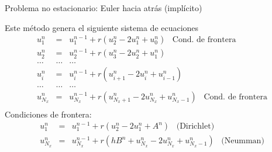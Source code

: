 \documentclass{beamer}
\begin{document}
\begin{frame}{Problema no estacionario: Euler hacia atr\'as (impl\'icito)}

Este método genera el siguiente sistema de ecuaciones
\begin{eqnarray*}
u_{1}^{n} & = & u_{1}^{n-1} + r \left(u_{2}^{n} - 2 u_{1}^{n} + \boxed{u_{0}^{n}}\right) \,\,\, \mbox{ Cond. de frontera}\\
u_{2}^{n} & = & u_{2}^{n-1} + r \left(u_{3}^{n} - 2 u_{2}^{n} + u_{1}^{n}\right) \\
\dots & \dots & \dots \\
u_{i}^{n} & = & u_{i}^{n-1} + r \left(u_{i+1}^{n} - 2 u_{i}^{n} + u_{i-1}^{n}\right) \\
\dots & \dots & \dots \\
u_{N_x}^{n} & = & u_{N_x}^{n-1} + r \left(\boxed{u_{N_x+1}^{n}} - 2 u_{N_x}^{n} + u_{N_x-1}^{n}\right) \,\,\, \mbox{ Cond. de frontera}\\
\end{eqnarray*}
%
Condiciones de frontera:
\begin{eqnarray*}
u_{1}^{n} & = & u_{1}^{n-1} + r \left(u_{2}^{n} - 2 u_{1}^{n} + \boxed{A^{n}}\right) \,\,\,\,\, \mbox{(Dirichlet)} \\
u_{N_x}^{n} & = & u_{N_x}^{n-1} + r \left(\boxed{h B^{n} + u_{N_x}^{n}} - 2 u_{N_x}^{n} + u_{N_x-1}^{n}\right) \,\,\,\,\, \mbox{(Neumman)}\\
\end{eqnarray*}

\end{frame}
\end{document}
